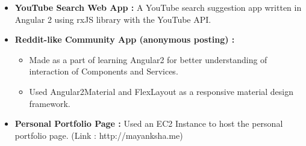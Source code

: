 
{\fontsize{11pt}{1em}\bodyfontlight\upshape\color{text}
  \begin{itemize}
\item \textbf{YouTube Search Web App : } A YouTube search suggestion app written in Angular 2 using rxJS library with the YouTube API.
\item \textbf{Reddit-like Community App (anonymous posting) : } 
		\begin{itemize}
				\item Made as a part of learning Angular2 for better understanding of interaction of Components and Services.
				\item Used Angular2Material and FlexLayout as a responsive material design framework.
		\end{itemize}
\item \textbf{Personal Portfolio Page : } Used an EC2 Instance to host the personal portfolio page. 						(Link : http://mayanksha.me)
  \end{itemize}
}
